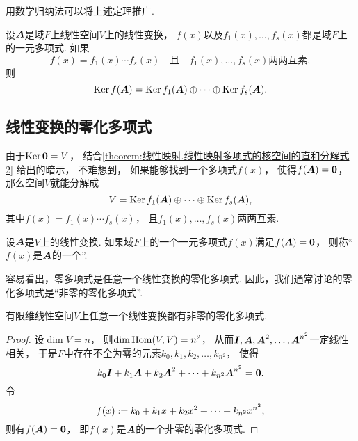 用数学归纳法可以将上述定理推广.
\begin{corollary}\label{theorem:线性映射.线性映射多项式的核空间的直和分解式2}
设\(\boldsymbol{A}\)是域\(F\)上线性空间\(V\)上的线性变换，
\(f(x)\)以及\(f_1(x),\dotsc,f_s(x)\)都是域\(F\)上的一元多项式.
如果\[
	f(x) = f_1(x) \dotsm f_s(x)
	\quad\text{且}\quad
	\text{$f_1(x),\dotsc,f_s(x)$两两互素},
\]
则\[
	\operatorname{Ker} f(\boldsymbol{A})
	= \operatorname{Ker} f_1(\boldsymbol{A})
	\oplus
	\dotsb
	\oplus \operatorname{Ker} f_s(\boldsymbol{A}).
\]
\end{corollary}

\subsection{线性变换的零化多项式}
由于\(\operatorname{Ker}\boldsymbol0 = V\)，
结合\cref{theorem:线性映射.线性映射多项式的核空间的直和分解式2} 给出的暗示，
不难想到，
如果能够找到一个多项式\(f(x)\)，
使得\(f(\boldsymbol{A}) = \boldsymbol0\)，
那么空间\(V\)就能分解成\begin{equation*}
	V = \operatorname{Ker} f_1(\boldsymbol{A})
	\oplus
	\dotsb
	\oplus \operatorname{Ker} f_s(\boldsymbol{A}),
\end{equation*}
其中\(f(x) = f_1(x) \dotsm f_s(x)\)，
且\(f_1(x),\dotsc,f_s(x)\)两两互素.

\begin{definition}
设\(\boldsymbol{A}\)是\(V\)上的线性变换.
如果域\(F\)上的一个一元多项式\(f(x)\)满足\(f(\boldsymbol{A}) = \boldsymbol0\)，
则称“\(f(x)\)是\(\boldsymbol{A}\)的一个”.
\end{definition}

容易看出，零多项式是任意一个线性变换的零化多项式.
因此，我们通常讨论的零化多项式是“非零的零化多项式”.

\begin{proposition}\label{theorem:线性映射.有限维线性空间上的线性变换都有非零的零化多项式}
有限维线性空间\(V\)上任意一个线性变换都有非零的零化多项式.
\begin{proof}
设\(\dim V = n\)，
则\(\dim\operatorname{Hom}(V,V) = n^2\)，
从而\(\boldsymbol{I},\boldsymbol{A},\boldsymbol{A}^2,\dotsc,\boldsymbol{A}^{n^2}\)一定线性相关，
于是\(F\)中存在不全为零的元素\(k_0,k_1,k_2,\dotsc,k_{n^2}\)，
使得\[
	k_0 \boldsymbol{I}
	+ k_1 \boldsymbol{A}
	+ k_2 \boldsymbol{A}^2
	+ \dotsb
	+ k_{n^2} \boldsymbol{A}^{n^2}
	= \boldsymbol0.
\]
令\[
	f(x) := k_0
	+ k_1 x
	+ k_2 x^2
	+ \dotsb
	+ k_{n^2} x^{n^2},
\]
则有\(f(\boldsymbol{A}) = \boldsymbol0\)，
即\(f(x)\)是\(\boldsymbol{A}\)的一个非零的零化多项式.
\end{proof}
\end{proposition}

